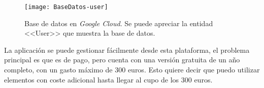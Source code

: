 \begin{figure}[h]
\centering
\texttt{[image: BaseDatos-user]}
\caption{Base de datos en \emph{Google Cloud}. Se puede apreciar la entidad <<User>> que muestra la base de datos.}
\label{fig:5.1}
\end{figure}

La aplicación se puede gestionar fácilmente desde esta plataforma, el problema principal es que es de pago, pero cuenta con una versión gratuita de un año completo, con un gasto máximo de 300 euros. Esto quiere decir que puedo utilizar elementos con coste adicional hasta llegar al cupo de los 300 euros. 
